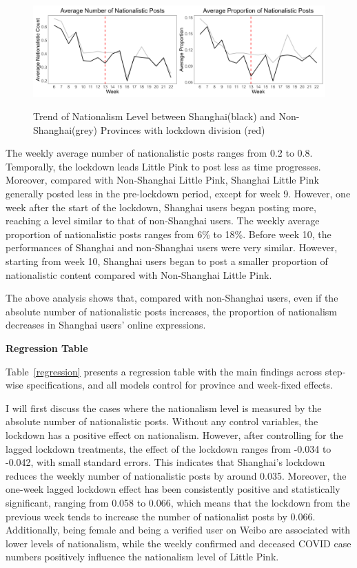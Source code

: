 \documentclass[12pt, ]{article}
\begin{document}
\begin{figure}[]

{\centering \includegraphics[width=1\textwidth,height=\textheight]{figures/trend.png}}
\caption{\label{fig-trend} Trend of Nationalism Level between Shanghai(black) and Non-Shanghai(grey) Provinces with lockdown division (red) }

\end{figure}

The weekly average number of nationalistic posts ranges from 0.2 to 0.8. Temporally, the lockdown leads Little Pink to post less as time progresses. Moreover, compared with Non-Shanghai Little Pink, Shanghai Little Pink generally posted less in the pre-lockdown period, except for week 9. However, one week after the start of the lockdown, Shanghai users began posting more, reaching a level similar to that of non-Shanghai users. The weekly average proportion of nationalistic posts ranges from 6\% to 18\%. Before week 10, the performances of Shanghai and non-Shanghai users were very similar. However, starting from week 10, Shanghai users began to post a smaller proportion of nationalistic content compared with Non-Shanghai Little Pink.

The above analysis shows that, compared with non-Shanghai users, even if the absolute number of nationalistic posts increases, the proportion of nationalism decreases in Shanghai users’ online expressions.

\begin{table}[htbp]
\caption{\textbf{Regression Table}}
\label{regression}

\end{table}


Table~\ref{regression} presents a regression table with the main findings across step-wise specifications, and all models control for province and week-fixed effects.



I will first discuss the cases where the nationalism level is measured by the absolute number of nationalistic posts. Without any control variables, the lockdown has a positive effect on nationalism. However, after controlling for the lagged lockdown treatments, the effect of the lockdown ranges from -0.034 to -0.042, with small standard errors. This indicates that Shanghai’s lockdown reduces the weekly number of nationalistic posts by around 0.035. Moreover, the one-week lagged lockdown effect has been consistently positive and statistically significant, ranging from 0.058 to 0.066, which means that the lockdown from the previous week tends to increase the number of nationalist posts by 0.066. Additionally, being female and being a verified user on Weibo are associated with lower levels of nationalism, while the weekly confirmed and deceased COVID case numbers positively influence the nationalism level of Little Pink.
\end{document}
